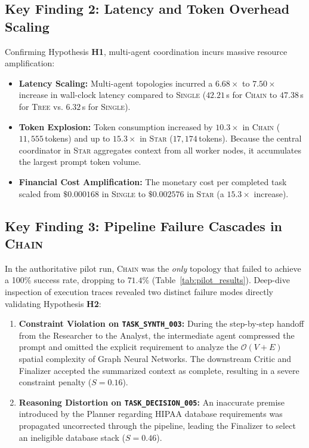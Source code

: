 \subsection{Key Finding 2: Latency and Token Overhead Scaling}
Confirming Hypothesis \textbf{H1}, multi-agent coordination incurs massive resource amplification:
\begin{itemize}
    \item \textbf{Latency Scaling:} Multi-agent topologies incurred a $6.68\times$ to $7.50\times$ increase in wall-clock latency compared to \textsc{Single} ($42.21\,$s for \textsc{Chain} to $47.38\,$s for \textsc{Tree} vs. $6.32\,$s for \textsc{Single}).
    \item \textbf{Token Explosion:} Token consumption increased by $10.3\times$ in \textsc{Chain} ($11{,}555\,$tokens) and up to $15.3\times$ in \textsc{Star} ($17{,}174\,$tokens). Because the central coordinator in \textsc{Star} aggregates context from all worker nodes, it accumulates the largest prompt token volume.
    \item \textbf{Financial Cost Amplification:} The monetary cost per completed task scaled from $\$0.000168$ in \textsc{Single} to $\$0.002576$ in \textsc{Star} (a $15.3\times$ increase).
\end{itemize}

\subsection{Key Finding 3: Pipeline Failure Cascades in \textsc{Chain}}
In the authoritative pilot run, \textsc{Chain} was the \textit{only} topology that failed to achieve a 100\% success rate, dropping to $71.4\%$ (Table~\ref{tab:pilot_results}). Deep-dive inspection of execution traces revealed two distinct failure modes directly validating Hypothesis \textbf{H2}:
\begin{enumerate}
    \item \textbf{Constraint Violation on \texttt{TASK\_SYNTH\_003}:} During the step-by-step handoff from the Researcher to the Analyst, the intermediate agent compressed the prompt and omitted the explicit requirement to analyze the $\mathcal{O}(V+E)$ spatial complexity of Graph Neural Networks. The downstream Critic and Finalizer accepted the summarized context as complete, resulting in a severe constraint penalty ($S = 0.16$).
    \item \textbf{Reasoning Distortion on \texttt{TASK\_DECISION\_005}:} An inaccurate premise introduced by the Planner regarding HIPAA database requirements was propagated uncorrected through the pipeline, leading the Finalizer to select an ineligible database stack ($S = 0.46$).
\end{enumerate}

